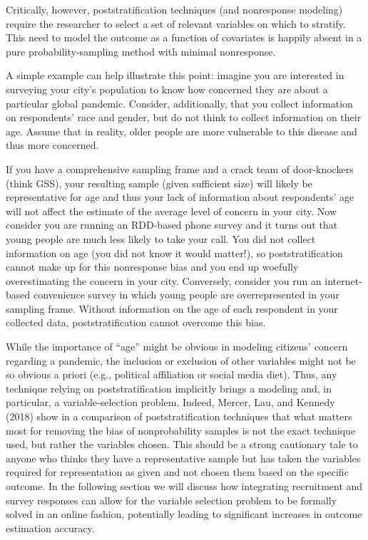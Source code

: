 \documentclass[a4paper,12pt]{article}
\theoremstyle{proposition}
\begin{document}
Critically, however, poststratification techniques (and nonresponse modeling) require the researcher to select a set of relevant variables on which to stratify. This need to model the outcome as a function of covariates is happily absent in a pure probability-sampling method with minimal nonresponse.

A simple example can help illustrate this point: imagine you are interested in surveying your city’s population to know how concerned they are about a particular global pandemic. Consider, additionally, that you collect information on respondents’ race and gender, but do not think to collect information on their age. Assume that in reality, older people are more vulnerable to this disease and thus more concerned.

If you have a comprehensive sampling frame and a crack team of door-knockers (think GSS), your resulting sample (given sufficient size) will likely be representative for age and thus your lack of information about respondents’ age will not affect the estimate of the average level of concern in your city. Now consider you are running an RDD-based phone survey and it turns out that young people are much less likely to take your call. You did not collect information on age (you did not know it would matter!), so poststratification cannot make up for this nonresponse bias and you end up woefully overestimating the concern in your city. Conversely, consider you run an internet-based convenience survey in which young people are overrepresented in your sampling frame. Without information on the age of each respondent in your collected data, poststratification cannot overcome this bias.

While the importance of “age” might be obvious in modeling citizens’ concern regarding a pandemic, the inclusion or exclusion of other variables might not be so obvious a priori (e.g., political affiliation or social media diet). Thus, any technique relying on poststratification implicitly brings a modeling and, in particular, a variable-selection problem. Indeed, Mercer, Lau, and Kennedy (2018) show in a comparison of poststratification techniques that what matters most for removing the bias of nonprobability samples is not the exact technique used, but rather the variables chosen. This should be a strong cautionary tale to anyone who thinks they have a representative sample but has taken the variables required for representation as given and not chosen them based on the specific outcome. In the following section we will discuss how integrating recruitment and survey responses can allow for the variable selection problem to be formally solved in an online fashion, potentially leading to significant increases in outcome estimation accuracy.
\end{document}
